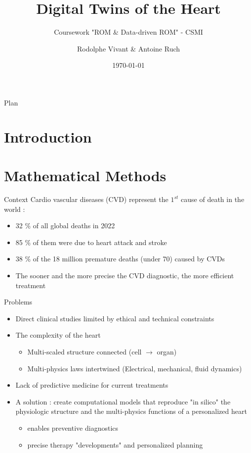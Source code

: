 \documentclass{beamer}
\title{Digital Twins of the Heart}
\subtitle{Coursework "ROM \& Data-driven ROM" - CSMI}
\author{Rodolphe Vivant \& Antoine Ruch}
\institute{UFR of Mathematics and Informatics}
\date{\today}
\begin{document}
\begin{frame}
  \titlepage
\end{frame}

\begin{frame}{Plan}
  \tableofcontents
\end{frame}

\section{Introduction}

\section{Mathematical Methods}
\begin{frame}{Context \cite{}}
  Cardio vascular diseases (CVD) represent the $1^{st}$ cause of death in the world \cite{who2025cvd} :
  \begin{itemize}
    \item 32 \% of all global deaths in 2022
    \item 85 \% of them were due to heart attack and stroke
    \item 38 \% of the 18 million premature deaths (under 70) caused by CVDs
    \item The sooner and the more precise the CVD diagnostic, the more efficient treatment 
  \end{itemize}
\end{frame}

\begin{frame}{Problems \cite{gerach2021electro}}
    \begin{itemize}
        \item Direct clinical studies limited by ethical and technical constraints
        \item The complexity of the heart 
        \begin{itemize}
            \item Multi-scaled structure connected (cell $\rightarrow$ organ)
            \item Multi-physics laws intertwined (Electrical, mechanical, fluid dynamics)
        \end{itemize}
        \item Lack of predictive medicine for current treatments
        \item A solution : create computational models that reproduce "in silico" the physiologic structure and the multi-physics functions of a personalized heart
        \begin{itemize}
            \item enables preventive diagnostics
            \item precise therapy "developments" and personalized planning 
        \end{itemize}  
    \end{itemize}
\end{frame}
\end{document}
